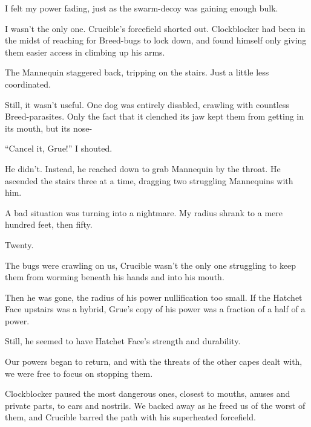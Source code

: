 I felt my power fading, just as the swarm-decoy was gaining enough bulk.



I wasn't the only one.  Crucible's forcefield shorted out.  Clockblocker had been in the midst of reaching for Breed-bugs to lock down, and found himself only giving them easier access in climbing up his arms.



The Mannequin staggered back, tripping on the stairs.  Just a little less coordinated.



Still, it wasn't useful.  One dog was entirely disabled, crawling with countless Breed-parasites.  Only the fact that it clenched its jaw kept them from getting in its mouth, but its nose-



``Cancel it, Grue!'' I shouted.



He didn't.  Instead, he reached down to grab Mannequin by the throat.  He ascended the stairs three at a time, dragging two struggling Mannequins with him.



A bad situation was turning into a nightmare.  My radius shrank to a mere hundred feet, then fifty.



Twenty.



The bugs were crawling on us, Crucible wasn't the only one struggling to keep them from worming beneath his hands and into his mouth.



Then he was gone, the radius of his power nullification too small.  If the Hatchet Face upstairs was a hybrid, Grue's copy of his power was a fraction of a half of a power.



Still, he seemed to have Hatchet Face's strength and durability.



Our powers began to return, and with the threats of the other capes dealt with, we were free to focus on stopping them.



Clockblocker paused the most dangerous ones, closest to mouths, anuses and private parts, to ears and nostrils.  We backed away as he freed us of the worst of them, and Crucible barred the path with his superheated forcefield.



